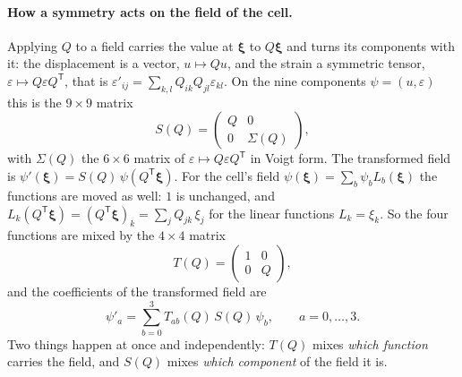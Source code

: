 \documentclass[11pt,a4paper]{article}
\newcommand{\bxi}{\boldsymbol{\xi}}
\begin{document}
\paragraph{How a symmetry acts on the field of the cell.} Applying $Q$ to a field carries the value at
$\bxi$ to $Q\bxi$ and turns its components with it: the displacement is a vector, $u\mapsto Qu$, and the
strain a symmetric tensor, $\varepsilon\mapsto Q\varepsilon Q^{\mathsf T}$, that is
$\varepsilon'_{ij}=\sum_{k,l}Q_{ik}Q_{jl}\varepsilon_{kl}$. On the nine components $\psi=(u,\varepsilon)$
this is the $9\times9$ matrix
\begin{equation}\label{eq:sq}
  S(Q)=\begin{pmatrix}Q&0\\0&\Sigma(Q)\end{pmatrix},
\end{equation}
with $\Sigma(Q)$ the $6\times6$ matrix of $\varepsilon\mapsto Q\varepsilon Q^{\mathsf T}$ in Voigt form. The
transformed field is $\psi'(\bxi)=S(Q)\,\psi(Q^{\mathsf T}\bxi)$. For the cell's field
$\psi(\bxi)=\sum_b\psi_bL_b(\bxi)$ the functions are moved as well: $1$ is unchanged, and
$L_{k}(Q^{\mathsf T}\bxi)=(Q^{\mathsf T}\bxi)_k=\sum_jQ_{jk}\,\xi_j$ for the linear functions
$L_k=\xi_k$. So the four functions are mixed by the $4\times4$ matrix
\begin{equation}\label{eq:tq}
  T(Q)=\begin{pmatrix}1&0\\0&Q\end{pmatrix},
\end{equation}
and the coefficients of the transformed field are
\begin{equation}\label{eq:coefmap}
  \psi'_a=\sum_{b=0}^{3}T_{ab}(Q)\,S(Q)\,\psi_b ,\qquad a=0,\dots,3.
\end{equation}
Two things happen at once and independently: $T(Q)$ mixes \emph{which function} carries the field, and
$S(Q)$ mixes \emph{which component} of the field it is.
\end{document}
